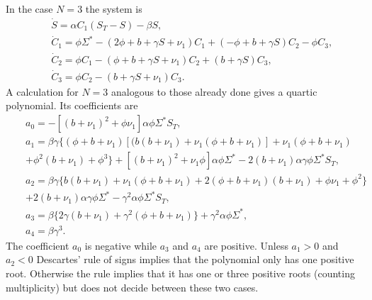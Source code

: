 \documentclass{article}
\begin{document}
In the case $N=3$ the system is
\begin{eqnarray}
&&\dot S=\alpha C_1(S_T-S)-\beta S,\label{N31}\\
&&\dot C_1=\phi\Sigma^*-(2\phi+b+\gamma S+\nu_1)C_1
+(-\phi+b+\gamma S)C_2-\phi C_3,
\label{N32}\\
&&\dot C_2=\phi C_1-(\phi+b+\gamma S+\nu_1)C_2+(b+\gamma S)C_3,\label{N33}\\
&&\dot C_3=\phi C_2-(b+\gamma S+\nu_1)C_3.\label{N34}
\end{eqnarray}
A calculation for $N=3$ analogous to those already done gives a quartic 
polynomial. Its coefficients are
\begin{eqnarray}
&&a_0=-[(b+\nu_1)^2+\phi\nu_1]\alpha\phi\Sigma^* S_T,\nonumber\\
&&a_1=\beta\gamma\{(\phi+b+\nu_1)[(b(b+\nu_1)+\nu_1(\phi+b+\nu_1)]
+\nu_1(\phi+b+\nu_1)\nonumber\\
&&+\phi^2(b+\nu_1)+\phi^3\}
+[(b+\nu_1)^2+\nu_1\phi]\alpha\phi\Sigma^*
-2(b+\nu_1)\alpha\gamma\phi\Sigma^* S_T,\nonumber\\
&&a_2=\beta\gamma\{b(b+\nu_1)+\nu_1(\phi+b+\nu_1)
+2(\phi+b+\nu_1)(b+\nu_1)+\phi\nu_1+\phi^2\}\nonumber\\
&&+2(b+\nu_1)\alpha\gamma\phi\Sigma^*
-\gamma^2\alpha\phi\Sigma^* S_T,\nonumber\\
&&a_3=\beta\{2\gamma (b+\nu_1)+\gamma^2(\phi+b+\nu_1)\}
+\gamma^2\alpha\phi\Sigma^*,\nonumber\\
&&a_4=\beta\gamma^3.\nonumber
\end{eqnarray}
The coefficient $a_0$ is negative while $a_3$ and $a_4$ are positive. Unless
$a_1>0$ and $a_2<0$ Descartes' rule of signs implies that the polynomial
only has one positive root. Otherwise the rule implies that it has one or
three positive roots (counting multiplicity) but does not decide between 
these two cases.
\end{document}
